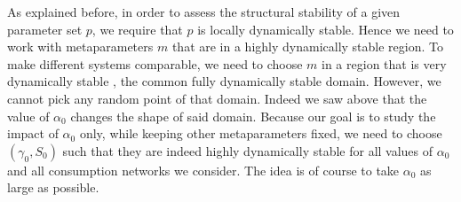 \documentclass[12pt, titlepage]{report}
\begin{document}
As explained before, in order to assess the structural stability of a given parameter set $p$, we require that $p$ is locally dynamically stable. Hence we need to work with metaparameters $m$ that are in a highly dynamically stable region. %
To make different systems comparable, we need to choose $m$ in a region that is very dynamically stable , \eg the common fully dynamically stable domain. However, we cannot pick any random point of that domain.
Indeed we saw above that the value of $\alpha_0$ changes the shape of said domain. Because our goal is to study the impact of $\alpha_0$ only, while keeping other metaparameters fixed,
we need to choose $(\gamma_0, S_0)$ such that they are indeed highly dynamically stable
for all values of $\alpha_0$ and all consumption networks we consider. The idea is of course to take $\alpha_0$ as large as possible.
\end{document}
